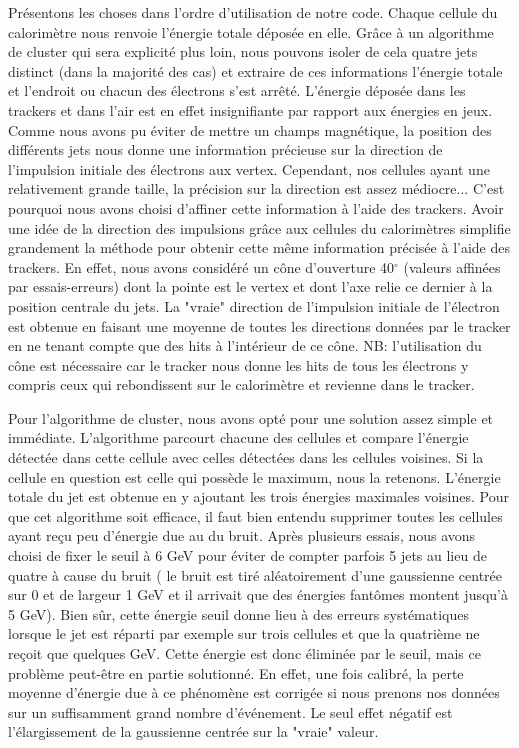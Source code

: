 \documentclass[11pt]{article}
\begin{document}
Présentons les choses dans l'ordre d'utilisation de notre code. Chaque cellule
du calorimètre nous renvoie l'énergie totale déposée en elle. Grâce à un
algorithme de cluster qui sera explicité plus loin, nous pouvons isoler de
cela quatre jets distinct (dans la majorité des cas) et extraire de ces
informations l'énergie totale et l'endroit ou chacun des électrons s'est
arrêté. L'énergie déposée dans les trackers et dans l'air est en effet
insignifiante par rapport aux énergies en jeux. Comme nous avons pu éviter de
mettre un champs magnétique, la position des différents jets nous donne une
information précieuse sur la direction de l'impulsion initiale des électrons aux
vertex. Cependant, nos cellules ayant une relativement grande taille, la
précision sur la direction est assez médiocre... C'est pourquoi nous avons
choisi d'affiner cette information à l'aide des trackers. Avoir une idée de la
direction des impulsions grâce aux cellules du calorimètres simplifie
grandement la méthode pour obtenir cette même information précisée à l'aide des
trackers. En effet, nous avons considéré un cône d'ouverture 40$^{\circ}$
(valeurs affinées par essais-erreurs) dont la pointe est le vertex et dont l'axe
relie ce dernier à la position centrale du jets. La "vraie" direction de
l'impulsion initiale de l'électron est obtenue en faisant une moyenne de toutes
les directions données par le tracker en ne tenant compte que des hits à
l'intérieur de ce cône. NB: l'utilisation du cône est nécessaire car le tracker
nous donne les hits de tous les électrons y compris ceux qui rebondissent sur
le calorimètre et revienne dans le tracker. 

Pour l'algorithme de cluster, nous avons opté pour une solution assez simple
et immédiate. L'algorithme parcourt chacune des cellules et compare l'énergie
détectée dans cette cellule avec celles détectées dans les cellules voisines.
Si la cellule en question est celle qui possède le maximum, nous la retenons.
L'énergie totale du jet est obtenue en y ajoutant les trois énergies
maximales voisines. Pour que cet algorithme soit efficace, il faut bien entendu
supprimer toutes les cellules ayant reçu peu d'énergie due au du bruit. Après
plusieurs essais, nous avons choisi de fixer le seuil à 6 GeV pour éviter de
compter parfois 5 jets au lieu de quatre à cause du bruit ( le bruit est tiré
aléatoirement d'une gaussienne centrée sur 0 et de largeur 1 GeV et il arrivait
que des énergies fantômes montent jusqu'à 5 GeV). Bien sûr, cette énergie seuil
donne lieu à des erreurs systématiques lorsque le jet est réparti par exemple
sur trois cellules et que la quatrième ne reçoit que quelques GeV. Cette
énergie est donc éliminée par le seuil, mais ce problème peut-être en partie
solutionné. En effet, une fois calibré, la perte moyenne d'énergie due à ce
phénomène est corrigée si nous prenons nos données sur un suffisamment grand
nombre d'événement. Le seul effet négatif est l'élargissement de la gaussienne
centrée sur la "vraie" valeur. 
\end{document}
